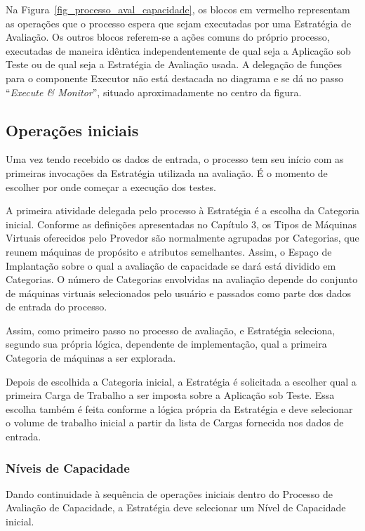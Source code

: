Na Figura~\ref{fig_processo_aval_capacidade}, os blocos em vermelho representam
as operações que o processo espera que sejam executadas por uma Estratégia de 
Avaliação. Os outros blocos referem-se a ações comuns do próprio processo, 
executadas de maneira idêntica independentemente de qual seja a Aplicação sob Teste
ou de qual seja a Estratégia de Avaliação usada. A delegação de funções para o 
componente Executor não está destacada no diagrama e se dá no passo 
``\emph{Execute \& Monitor}'', situado aproximadamente no centro da figura.

\subsection{Operações iniciais}
Uma vez tendo recebido os dados de entrada, o processo tem seu início com as 
primeiras invocações da Estratégia utilizada na avaliação. É o momento de escolher
por onde começar a execução dos testes.

A primeira atividade delegada pelo processo à Estratégia é a escolha da Categoria 
inicial. Conforme as definições apresentadas no Capítulo 3, os Tipos de Máquinas
Virtuais oferecidos pelo Provedor são normalmente agrupadas por Categorias, que
reunem máquinas de propósito e atributos semelhantes. Assim, o Espaço de Implantação
sobre o qual a avaliação de capacidade se dará está dividido em Categorias. O número 
de Categorias envolvidas na avaliação depende do conjunto de máquinas virtuais
selecionados pelo usuário e passados como parte dos dados de entrada do processo.

Assim, como primeiro passo no processo de avaliação, e Estratégia seleciona, 
segundo sua própria lógica, dependente de implementação, qual a primeira
Categoria de máquinas a ser explorada.

Depois de escolhida a Categoria inicial, a Estratégia é solicitada a escolher 
qual a primeira Carga de Trabalho a ser imposta sobre a Aplicação sob Teste. Essa 
escolha também é feita conforme a lógica própria da Estratégia e deve selecionar
o volume de trabalho inicial a partir da lista de Cargas fornecida nos dados de 
entrada.

\subsubsection{Níveis de Capacidade}
Dando continuidade à sequência de operações iniciais dentro do Processo de Avaliação 
de Capacidade, a Estratégia deve selecionar um Nível de Capacidade inicial. 

